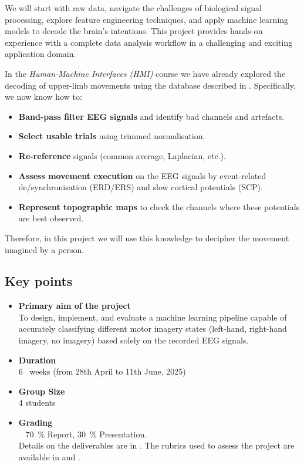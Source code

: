 \documentclass[11pt]{exam}
\begin{document}
    We will start with raw data, navigate the challenges of biological signal processing, explore feature engineering techniques, and apply machine learning models to decode the brain's intentions. This project provides hands-on experience with a complete data analysis workflow in a challenging and exciting application domain.

    In the \emph{Human-Machine Interfaces (HMI)} course we have already explored the decoding of upper-limb movements using the database described in \href{https://doi.org/10.1371/journal.pone.0182578}{}. Specifically, we now know how to:
    \begin{itemize}
        \item \textbf{Band-pass filter EEG signals} and identify bad channels and artefacts.
        \item \textbf{Select usable trials} using trimmed normalisation.
        \item \textbf{Re-reference} signals (common average, Laplacian, etc.).
        \item \textbf{Assess movement execution} on the EEG signals by event-related de/synchronisation (ERD/ERS) and slow cortical potentials (SCP).
        \item \textbf{Represent topographic maps} to check the channels where these potentials are best observed.
    \end{itemize}

    Therefore, in this project we will use this knowledge to decipher the movement imagined by a person.

    \subsection{Key points}

    \begin{itemize}
        \item \textbf{Primary aim of the project}\\To design, implement, and evaluate a machine learning pipeline capable of accurately classifying different motor imagery states (left-hand, right-hand imagery, no imagery) based solely on the recorded EEG signals.
        \item \textbf{Duration}\\6 \textonehalf~weeks (from 28th April to 11th June, 2025)
        \item \textbf{Group Size}\\4 students
        \item \textbf{Grading}\\~
        \SI{70}{\percent} Report, \SI{30}{\percent} Presentation.\\ Details on the deliverables are in . The rubrics used to assess the project are available in  and .
    \end{itemize}
\end{document}
